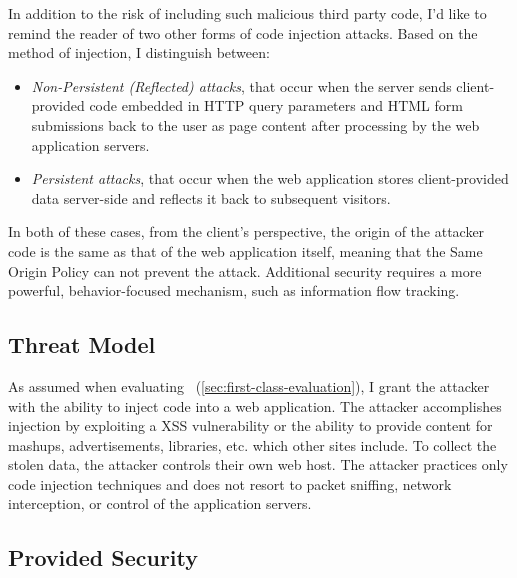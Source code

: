 In addition to the risk of including such malicious third party code, I'd like to remind the reader of two other forms of code injection attacks.
Based on the method of injection, I distinguish between:

\begin{itemize}

\item \textit{Non-Persistent (Reflected) attacks}, that occur when the server sends client-provided code embedded in HTTP query parameters and HTML form submissions back to the user as page content after processing by the web application servers.

\item \textit{Persistent attacks}, that occur when the web application stores client-provided data server-side and reflects it back to subsequent visitors.

\end{itemize}
In both of these cases, from the client's perspective, the origin of the attacker code is the same as that of the web application itself, meaning that the Same Origin Policy can not prevent the attack.
Additional security requires a more powerful, behavior-focused mechanism, such as information flow tracking.

\subsection{Threat Model}
\label{sec:jitflow-threatmodel}

As assumed when evaluating \FlowCore\ (\autoref{sec:first-class-evaluation}), I grant the attacker with the ability to inject code into a web application.
The attacker accomplishes injection by exploiting a XSS vulnerability or the ability to provide content for mashups, advertisements, libraries, etc. which other sites include.
To collect the stolen data, the attacker controls their own web host.
The attacker practices only code injection techniques and does not resort to packet sniffing, network interception, or control of the application servers.

\subsection{Provided Security}
\label{sec:jitflow-providedsecurity}

